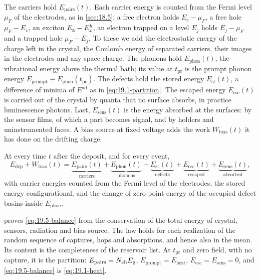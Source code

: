 The carriers hold $E_{\mathrm{pairs}}(t)$. Each carrier energy is counted from the Fermi level $\mu_F$ of the electrodes, as in \cref{sec:18.5}: a free electron holds $E_c - \mu_F$, a free hole $\mu_F - E_v$, an exciton $E_{\mathrm{g}} - E_x^b$, an electron trapped on a level $E_j$ holds $E_j - \mu_F$ and a trapped hole $\mu_F - E_j$. To these we add the electrostatic energy of the charge left in the crystal, the Coulomb energy of separated carriers, their images in the electrodes and any space charge. The phonons hold $E_{\mathrm{phon}}(t)$, the vibrational energy above the thermal bath; its value at $t_{\mathrm{pr}}$ is the prompt phonon energy $E_{\mathrm{prompt}} \equiv E_{\mathrm{phon}}(t_{\mathrm{pr}})$. The defects hold the stored energy $E_{\mathrm{st}}(t)$, a difference of minima of $E^{\mathrm{ad}}$ as in \cref{eq:19.1-partition}. The escaped energy $E_{\mathrm{esc}}(t)$ is carried out of the crystal by quanta that no surface absorbs, in practice luminescence photons. Last, $E_{\mathrm{sens}}(t)$ is the energy absorbed at the surfaces: by the sensor films, of which a part becomes signal, and by holders and uninstrumented faces. A bias source at fixed voltage adds the work $W_{\mathrm{bias}}(t)$ it has done on the drifting charge.
\begin{keyresult}
At every time $t$ after the deposit, and for every event,
\begin{equation}
  E_{\mathrm{dep}} + W_{\mathrm{bias}}(t) =
  \underbrace{E_{\mathrm{pairs}}(t)}_{\text{carriers}} +
  \underbrace{E_{\mathrm{phon}}(t)}_{\text{phonons}} +
  \underbrace{E_{\mathrm{st}}(t)}_{\text{defects}} +
  \underbrace{E_{\mathrm{esc}}(t)}_{\text{escaped}} +
  \underbrace{E_{\mathrm{sens}}(t)}_{\text{absorbed}} ,
  \label{eq:19.5-balance}
\end{equation}
with carrier energies counted from the Fermi level of the electrodes, the stored energy configurational, and the change of zero-point energy of the occupied defect basins inside $E_{\mathrm{phon}}$.
\end{keyresult}
\noindent {} proves \cref{eq:19.5-balance} from the conservation of the total energy of crystal, sensors, radiation and bias source. The law holds for each realization of the random sequence of captures, hops and absorptions, and hence also in the mean. Its content is the completeness of the reservoir list. At $t_{\mathrm{pr}}$ and zero field, with no capture, it is the partition: $E_{\mathrm{pairs}} = N_{\mathrm{eh}}E_{\mathrm{g}}$, $E_{\mathrm{prompt}} = E_{\mathrm{heat}}$, $E_{\mathrm{esc}} = E_{\mathrm{sens}} = 0$, and \cref{eq:19.5-balance} is \cref{eq:19.1-heat}.

